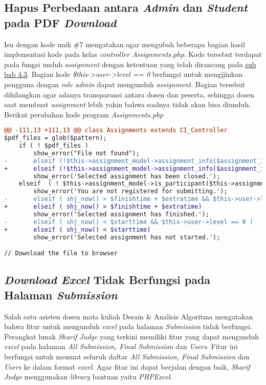 	\subsection{Hapus Perbedaan antara \textit{Admin} dan \textit{Student} pada PDF \textit{Download}}
	Isu dengan kode unik \#7 mengatakan agar mengubah beberapa bagian hasil implementasi kode pada kelas \textit{controller Assignments.php}. Kode tersebut terdapat pada fungsi unduh \textit{assignment} dengan ketentuan yang telah dirancang pada \hyperref[chap:batassoal]{sub bab 4.3}. Bagian kode \textit{\$this->user->level == 0} berfungsi untuk mengijinkan pengguna dengan \textit{role admin} dapat mengunduh \textit{assignment}. Bagian tersebut dihilangkan agar adanya transparansi antara dosen dan peserta, sehingga dosen saat membuat \textit{assignment} lebih yakin bahwa soalnya tidak akan bisa diunduh. Berikut perubahan kode program
	\textit{Assignments.php}
\begin{lstlisting}[language=diff, basicstyle=\ttfamily, frame=single,
columns=fullflexible, keepspaces=true, breaklines=true]
@@ -111,13 +111,13 @@ class Assignments extends CI_Controller
$pdf_files = glob($pattern);
	if ( ! $pdf_files )
		show_error("File not found");
-   	elseif (!$this->assignment_model->assignment_info($assignment_id)['open'] && $this->user->level == 0 )
+   	elseif (!$this->assignment_model->assignment_info($assignment_id)['open'])
		show_error('Selected assignment has been closed.');
	elseif  ( ! $this->assignment_model->is_participant($this->assignment_model->assignment_info($assignment_id)['participants'],$this->user->username) )
		show_error('You are not registered for submitting.');
-   	elseif ( shj_now() > $finishtime + $extratime && $this->user->level == 0 )
+   	elseif ( shj_now() > $finishtime + $extratime)
		show_error('Selected assignment has finished.');
-   	elseif ( shj_now() < $starttime && $this->user->level == 0 )
+   	elseif ( shj_now() < $starttime)
		show_error('Selected assignment has not started.');

// Download the file to browser
\end{lstlisting}

	\subsection{\textit{Download Excel} Tidak Berfungsi pada Halaman \textit{Submission}}
	Salah satu asisten dosen mata kuliah Desain \& Analisis Algoritma mengatakan bahwa fitur untuk mengunduh \textit{excel} pada halaman \textit{Submission} tidak berfungsi. Perangkat lunak \textit{Sharif Judge} yang terkini memiliki fitur yang dapat mengunduh \textit{excel} pada halaman \textit{All Submission, Final Submission} dan \textit{Users}. Fitur ini berfungsi untuk memuat seluruh daftar \textit{All Submission, Final Submission} dan \textit{Users} ke dalam format \textit{excel}. Agar fitur ini dapat berjalan dengan baik, \textit{Sharif Judge} menggunakan \textit{library} bantuan yaitu \textit{PHPExcel}.
	
